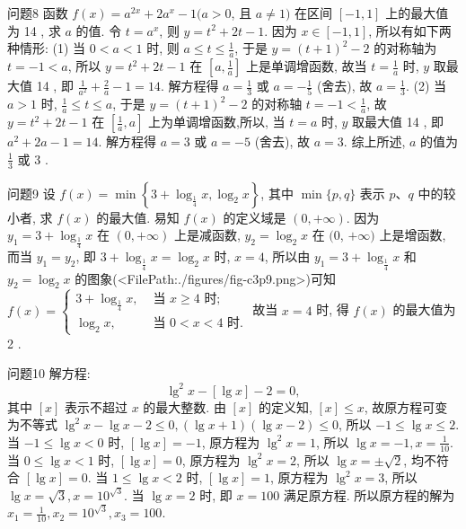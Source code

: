问题8 函数 $f(x)=a^{2 x}+2 a^x-1(a>0$, 且 $a \neq 1)$ 在区间 $[-1,1]$ 上的最大值为 14 , 求 $a$ 的值.
令 $t=a^x$, 则 $y=t^2+2 t-1$. 因为 $x \in[-1,1]$, 所以有如下两种情形: 
(1) 当 $0<a<1$ 时, 则 $a \leqslant t \leqslant \frac{1}{a}$, 于是 $y=(t+1)^2-2$ 的对称轴为 $t= -1<a$, 所以 $y=t^2+2 t-1$ 在 $\left[a, \frac{1}{a}\right]$ 上是单调增函数, 故当 $t=\frac{1}{a}$ 时, $y$ 取最大值 14 , 即 $\frac{1}{a^2}+\frac{2}{a}-1=14$. 
解方程得 $a=\frac{1}{3}$ 或 $a=-\frac{1}{5}$ (舍去), 故 $a= \frac{1}{3}$. 
(2) 当 $a>1$ 时, $\frac{1}{a} \leqslant t \leqslant a$, 于是 $y=(t+1)^2-2$ 的对称轴 $t=-1< \frac{1}{a}$, 故 $y=t^2+2 t-1$ 在 $\left[\frac{1}{a}, a\right]$ 上为单调增函数,所以, 当 $t=a$ 时, $y$ 取最大值 14 , 即 $a^2+2 a-1=14$. 
解方程得 $a=3$ 或 $a=-5$ (舍去), 故 $a=3$. 
综上所述, $a$ 的值为 $\frac{1}{3}$ 或 3 .



问题9 设 $f(x)=\min \left\{3+\log _{\frac{1}{4}} x, \log _2 x\right\}$, 其中 $\min \{p, q\}$ 表示 $p 、 q$ 中的较小者, 求 $f(x)$ 的最大值.
易知 $f(x)$ 的定义域是 $(0,+\infty)$. 
因为 $y_1= 3+\log _{\frac{1}{4}} x$ 在 $(0,+\infty)$ 上是减函数, $y_2=\log _2 x$ 在 $(0$, $+\infty)$ 上是增函数, 而当 $y_1=y_2$, 即 $3+\log _{\frac{1}{4}} x=\log _2 x$ 时, $x=4$, 所以由 $y_1=3+\log _{\frac{1}{4}} x$ 和 $y_2=\log _2 x$ 的图象(<FilePath:./figures/fig-c3p9.png>)可知 $f(x)=\left\{\begin{array}{ll}3+\log _{\frac{1}{4}} x, & \text { 当 } x \geqslant 4 \text { 时; } \\ \log _2 x, & \text { 当 } 0<x<4 \text { 时.
}\end{array}\right.$ 
故当 $x=4$ 时, 得 $f(x)$ 的最大值为 2 .



问题10 解方程:
$$
\lg ^2 x-[\lg x]-2=0,
$$
其中 $[x]$ 表示不超过 $x$ 的最大整数.
由 $[x]$ 的定义知, $[x] \leqslant x$, 故原方程可变为不等式 $\lg ^2 x-\lg x-2 \leqslant 0,(\lg x+1)(\lg x-2) \leqslant 0$, 所以 $-1 \leqslant \lg x \leqslant 2$. 
当 $-1 \leqslant \lg x<0$ 时, $[\lg x]=-1$, 原方程为 $\lg ^2 x=1$, 所以 $\lg x=-1, x=\frac{1}{10}$. 
当 $0 \leqslant \lg x<1$ 时, $[\lg x]=0$, 原方程为 $\lg ^2 x=2$, 所以 $\lg x= \pm \sqrt{2}$, 均不符合 $[\lg x]=0$. 
当 $1 \leqslant \lg x<2$ 时, $[\lg x]=1$, 原方程为 $\lg ^2 x=3$, 所以 $\lg x=\sqrt{3}, x=10^{\sqrt{3}}$. 当 $\lg x=2$ 时, 即 $x=100$ 满足原方程.
所以原方程的解为 $x_1=\frac{1}{10}, x_2= 10^{\sqrt{3}}, x_3=100$.



